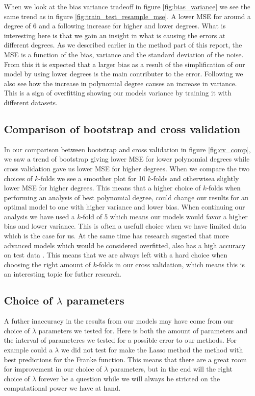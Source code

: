 \documentclass[12pt]{article}
\begin{document}
When we look at the bias variance tradeoff in figure \ref{fig:bias_variance} we see the same trend as in figure \ref{fig:train_test_resample_mse}. A lower MSE for around a degree of 6 and a following increase for higher and lower degrees. What is interesting here is that we gain an insight in what is causing the errors at different degrees. As we described earlier in the method part of this report, the MSE is a function of the bias, variance and the standard deviation of the noise. From this it is expected that a larger bias as a result of the simplification of our model by using lower degrees is the main contributer to the error. Following we also see how the increase in polynomial degree causes an increase in variance. This is a sign of overfitting showing our models variance by training it with different datasets.

\subsection{Comparison of bootstrap and cross validation}
In our comparison between bootstrap and cross validation in figure \ref{fig:cv_comp}, we saw a trend of bootstrap giving lower MSE for lower polynomial degrees while cross validation gave us lower MSE for higher degrees. When we compare the two choices of $k$-folds we see a smoother plot for 10 $k$-folds and otherwisea slightly lower MSE for higher degrees. This means that a higher choice of $k$-folds when performing an analysis of best polynomial degree, could change our results for an optimal model to one with higher variance and lower bias. When continuing our analysis we have used a $k$-fold of 5 which means our models would favor a higher bias and lower variance. This is often a usefull choice when we have limited data which is the case for us. At the same time has research sugested that more advanced models which would be considered overfitted, also has a high accuracy on test data \cite{overfitting}. This means that we are always left with a hard choice when choosing the right amount of $k$-folds in our cross validation, which means this is an interesting topic for futher research.

\subsection{Choice of $\lambda$ parameters}
A futher inaccuracy in the results from our models may have come from our choice of $\lambda$ parameters we tested for. Here is both the amount of parameters and the interval of parameteres we tested for a possible error to our methods. For example could a $\lambda$ we did not test for make the Lasso method the method with best predictions for the Franke function. This means that there are a great room for improvement in our choice of $\lambda$ parameters, but in the end will the right choice of $\lambda$ forever be a question while we will always be stricted on the computational power we have at hand.
\end{document}
